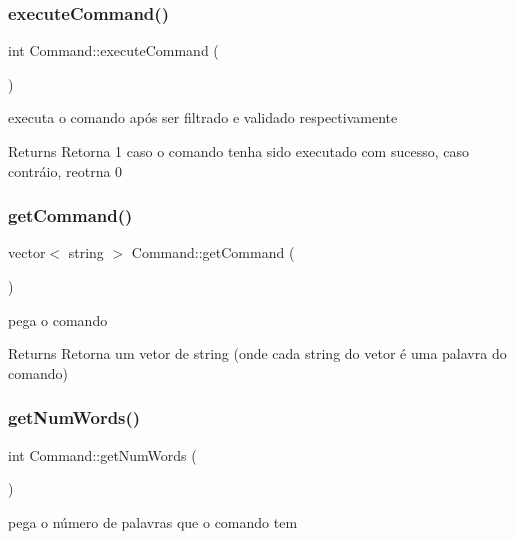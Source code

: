 \subsubsection{\texorpdfstring{execute\+Command()}{executeCommand()}}
{\footnotesize\ttfamily int Command\+::execute\+Command (\begin{DoxyParamCaption}{ }\end{DoxyParamCaption})}



executa o comando após ser filtrado e validado respectivamente 

\begin{DoxyReturn}{Returns}
Retorna 1 caso o comando tenha sido executado com sucesso, caso contráio, reotrna 0 
\end{DoxyReturn}
\mbox{\label{classCommand_aadc7d1f81a2f438f53c15f31e77ba8aa}} 
\subsubsection{\texorpdfstring{get\+Command()}{getCommand()}}
{\footnotesize\ttfamily vector$<$ string $>$ Command\+::get\+Command (\begin{DoxyParamCaption}{ }\end{DoxyParamCaption})}



pega o comando 

\begin{DoxyReturn}{Returns}
Retorna um vetor de string (onde cada string do vetor é uma palavra do comando) 
\end{DoxyReturn}
\mbox{\label{classCommand_a966fc59f6572e832e85b1791479714c4}} 
\subsubsection{\texorpdfstring{get\+Num\+Words()}{getNumWords()}}
{\footnotesize\ttfamily int Command\+::get\+Num\+Words (\begin{DoxyParamCaption}{ }\end{DoxyParamCaption})}



pega o número de palavras que o comando tem 

